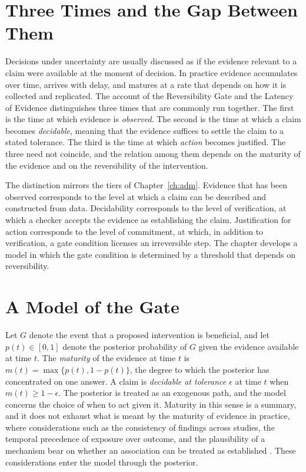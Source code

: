 \documentclass[11pt,twoside,openright]{book}
\theoremstyle{plain}
\theoremstyle{definition}
\theoremstyle{remark}
\begin{document}
\section{Three Times and the Gap Between Them}

Decisions under uncertainty are usually discussed as if the evidence relevant to a claim were available at the moment of decision. In practice evidence accumulates over time, arrives with delay, and matures at a rate that depends on how it is collected and replicated. The account of the Reversibility Gate and the Latency of Evidence distinguishes three times that are commonly run together. The first is the time at which evidence is \emph{observed}. The second is the time at which a claim becomes \emph{decidable}, meaning that the evidence suffices to settle the claim to a stated tolerance. The third is the time at which \emph{action} becomes justified. The three need not coincide, and the relation among them depends on the maturity of the evidence and on the reversibility of the intervention.

The distinction mirrors the tiers of Chapter~\ref{ch:adm}. Evidence that has been observed corresponds to the level at which a claim can be described and constructed from data. Decidability corresponds to the level of verification, at which a checker accepts the evidence as establishing the claim. Justification for action corresponds to the level of commitment, at which, in addition to verification, a gate condition licenses an irreversible step. The chapter develops a model in which the gate condition is determined by a threshold that depends on reversibility.

\section{A Model of the Gate}

Let $G$ denote the event that a proposed intervention is beneficial, and let $p(t)\in[0,1]$ denote the posterior probability of $G$ given the evidence available at time $t$. The \emph{maturity} of the evidence at time $t$ is $m(t)=\max\{p(t),1-p(t)\}$, the degree to which the posterior has concentrated on one answer. A claim is \emph{decidable at tolerance $\epsilon$} at time $t$ when $m(t)\ge1-\epsilon$. The posterior is treated as an exogenous path, and the model concerns the choice of when to act given it. Maturity in this sense is a summary, and it does not exhaust what is meant by the maturity of evidence in practice, where considerations such as the consistency of findings across studies, the temporal precedence of exposure over outcome, and the plausibility of a mechanism bear on whether an association can be treated as established \cite{hill1965}. These considerations enter the model through the posterior.
\end{document}

